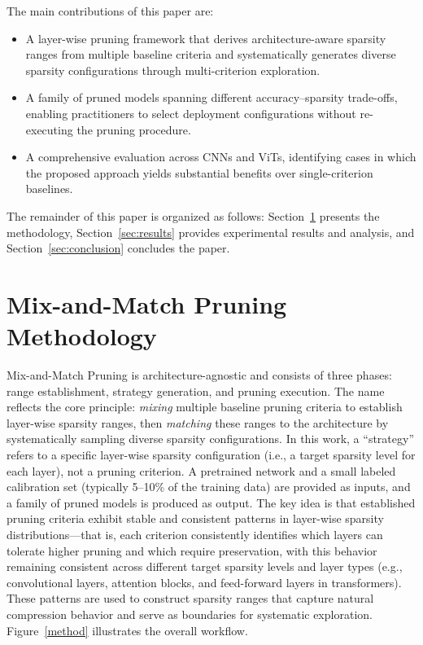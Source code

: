 \documentclass[11pt, conference]{IEEEtran}
\begin{document}
The main contributions of this paper are:
\begin{itemize}
    \item A layer-wise pruning framework that derives architecture-aware sparsity ranges from multiple baseline criteria and systematically generates diverse sparsity configurations through multi-criterion exploration.
    \item A family of pruned models spanning different accuracy--sparsity trade-offs, enabling practitioners to select deployment configurations without re-executing the pruning procedure.
    \item A comprehensive evaluation across CNNs and ViTs, identifying cases in which the proposed approach yields substantial benefits over single-criterion baselines.
\end{itemize}

The remainder of this paper is organized as follows: Section~\ref{sec:method} presents the methodology, Section~\ref{sec:results} provides experimental results and analysis, and Section~\ref{sec:conclusion} concludes the paper.

\FloatBarrier
\section{Mix-and-Match Pruning Methodology}
\label{sec:method}
Mix-and-Match Pruning is architecture-agnostic and consists of three phases: range establishment, strategy generation, and pruning execution. The name reflects the core principle: \textit{mixing} multiple baseline pruning criteria to establish layer-wise sparsity ranges, then \textit{matching} these ranges to the architecture by systematically sampling diverse sparsity configurations. In this work, a ``strategy'' refers to a specific layer-wise sparsity configuration (i.e., a target sparsity level for each layer), not a pruning criterion. A pretrained network and a small labeled calibration set (typically 5--10\% of the training data) are provided as inputs, and a family of pruned models is produced as output. The key idea is that established pruning criteria exhibit stable and consistent patterns in layer-wise sparsity distributions—that is, each criterion consistently identifies which layers can tolerate higher pruning and which require preservation, with this behavior remaining consistent across different target sparsity levels and layer types (e.g., convolutional layers, attention blocks, and feed-forward layers in transformers). These patterns are used to construct sparsity ranges that capture natural compression behavior and serve as boundaries for systematic exploration. Figure~\ref{method} illustrates the overall workflow.
\end{document}
